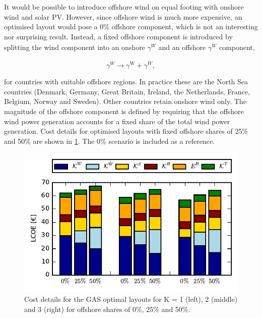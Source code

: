 \documentclass[a4paper, 5p, sort&compress]{elsarticle}%
\begin{document}
It would be possible to introduce offshore wind on equal footing with
onshore wind and solar PV. However, since offshore wind is much more
expensive, an optimised layout would pose a 0\% offshore component,
which is not an interesting nor surprising result. Instead, a fixed
offshore component is introduced by splitting the wind component into
an onshore $\gamma^{W}$ and an offshore $\gamma^{\tilde{W}}$ component,

\begin{equation}
  \label{eq:11}
  \gamma^{W} \to \gamma^{\text{W}} + \gamma^{\text{$\tilde{W}$}}, 
\end{equation}

for countries with suitable offshore regions. In practice these are
the North Sea countries (Denmark, Germany, Great Britain, Ireland, the
Netherlands, France, Belgium, Norway and Sweden). Other countries
retain onshore wind only. The magnitude of the offshore component is
defined by requiring that the offshore wind power generation accounts
for a fixed share of the total wind power generation. %
%
%
Cost details for optimised layouts with fixed offshore shares of 25\%
and 50\% are shown in \cref{fig:cost-offshore}. The 0\% scenario is
included as a reference.

\begin{figure}[h!]
  \centering
  \includegraphics[width = \columnwidth]{costOffshoreVE50}
  \caption{Cost details for the GAS optimal layouts for K = 1 (left),
    2 (middle) and 3 (right) for offshore shares of 0\%, 25\% and 50\%.}
  \label{fig:cost-offshore}
\end{figure}
\end{document}
